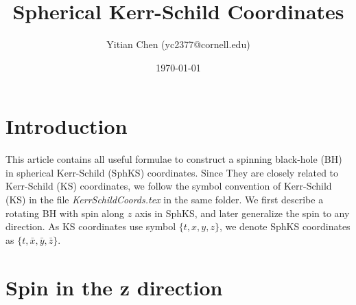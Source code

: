 \documentclass{article}
\title{Spherical Kerr-Schild Coordinates}
\author{Yitian Chen (yc2377@cornell.edu)}
\date{\today}
\begin{document}
\maketitle

\section{Introduction}
This article contains all useful formulae to construct a spinning black-hole (BH) in spherical Kerr-Schild (SphKS) coordinates. Since They are closely related to Kerr-Schild (KS) coordinates, we follow the symbol convention of Kerr-Schild (KS) in the file \textit{KerrSchildCoords.tex} in the same folder. We first describe a rotating BH with spin along $z$ axis in SphKS, and later generalize the spin to any direction. As KS coordinates use symbol $\{t,x,y,z\}$, we denote SphKS coordinates as $\{t,\bar{x},\bar{y},\bar{z}\}$.


\section{Spin in the z direction}
\end{document}
